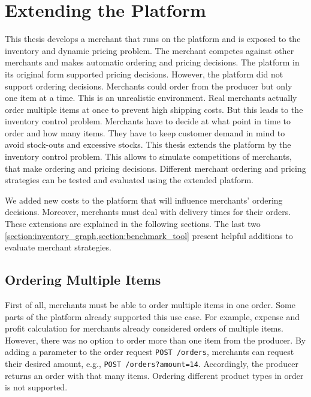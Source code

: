 
\chapter{Extending the \pricewars Platform}

This thesis develops a merchant that runs on the \pricewars platform and is exposed to the inventory and dynamic pricing problem.
The merchant competes against other merchants and makes automatic ordering and pricing decisions.
The platform in its original form supported pricing decisions.
However, the platform did not support ordering decisions.
Merchants could order from the producer but only one item at a time.
This is an unrealistic environment.
Real merchants actually order multiple items at once to prevent high shipping costs.
But this leads to the inventory control problem.
Merchants have to decide at what point in time to order and how many items.
They have to keep customer demand in mind to avoid stock-outs and excessive stocks.
This thesis extends the \pricewars platform by the inventory control problem.
This allows to simulate competitions of merchants, that make ordering and pricing decisions.
Different merchant ordering and pricing strategies can be tested and evaluated using the extended platform.

We added new costs to the platform that will influence merchants' ordering decisions.
Moreover, merchants must deal with delivery times for their orders.
These extensions are explained in the following sections.
The last two \cref{section:inventory_graph,section:benchmark_tool} present helpful additions to evaluate merchant strategies.

\section{Ordering Multiple Items}
\label{section:multiple_items}
First of all, merchants must be able to order multiple items in one order.
Some parts of the platform already supported this use case.
For example, expense and profit calculation for merchants already considered orders of multiple items.
However, there was no option to order more than one item from the producer.
By adding a parameter to the order request \texttt{POST /orders}, merchants can request their desired amount, e.g., \texttt{POST /orders?amount=14}.
Accordingly, the producer returns an order with that many items.
Ordering different product types in order is not supported.

